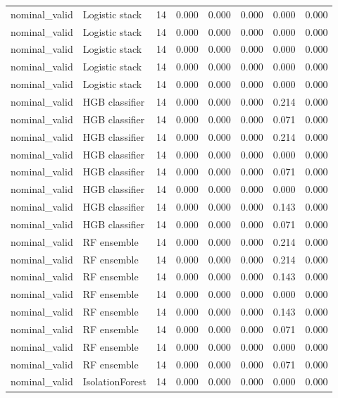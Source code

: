 {\begin{longtable}{llrrrrrr}
nominal\_valid & Logistic stack & 14 & 0.000 & 0.000 & 0.000 & 0.000 & 0.000 \\
nominal\_valid & Logistic stack & 14 & 0.000 & 0.000 & 0.000 & 0.000 & 0.000 \\
nominal\_valid & Logistic stack & 14 & 0.000 & 0.000 & 0.000 & 0.000 & 0.000 \\
nominal\_valid & Logistic stack & 14 & 0.000 & 0.000 & 0.000 & 0.000 & 0.000 \\
nominal\_valid & Logistic stack & 14 & 0.000 & 0.000 & 0.000 & 0.000 & 0.000 \\
nominal\_valid & HGB classifier & 14 & 0.000 & 0.000 & 0.000 & 0.214 & 0.000 \\
nominal\_valid & HGB classifier & 14 & 0.000 & 0.000 & 0.000 & 0.071 & 0.000 \\
nominal\_valid & HGB classifier & 14 & 0.000 & 0.000 & 0.000 & 0.214 & 0.000 \\
nominal\_valid & HGB classifier & 14 & 0.000 & 0.000 & 0.000 & 0.000 & 0.000 \\
nominal\_valid & HGB classifier & 14 & 0.000 & 0.000 & 0.000 & 0.071 & 0.000 \\
nominal\_valid & HGB classifier & 14 & 0.000 & 0.000 & 0.000 & 0.000 & 0.000 \\
nominal\_valid & HGB classifier & 14 & 0.000 & 0.000 & 0.000 & 0.143 & 0.000 \\
nominal\_valid & HGB classifier & 14 & 0.000 & 0.000 & 0.000 & 0.071 & 0.000 \\
nominal\_valid & RF ensemble & 14 & 0.000 & 0.000 & 0.000 & 0.214 & 0.000 \\
nominal\_valid & RF ensemble & 14 & 0.000 & 0.000 & 0.000 & 0.214 & 0.000 \\
nominal\_valid & RF ensemble & 14 & 0.000 & 0.000 & 0.000 & 0.143 & 0.000 \\
nominal\_valid & RF ensemble & 14 & 0.000 & 0.000 & 0.000 & 0.000 & 0.000 \\
nominal\_valid & RF ensemble & 14 & 0.000 & 0.000 & 0.000 & 0.143 & 0.000 \\
nominal\_valid & RF ensemble & 14 & 0.000 & 0.000 & 0.000 & 0.071 & 0.000 \\
nominal\_valid & RF ensemble & 14 & 0.000 & 0.000 & 0.000 & 0.000 & 0.000 \\
nominal\_valid & RF ensemble & 14 & 0.000 & 0.000 & 0.000 & 0.071 & 0.000 \\
nominal\_valid & IsolationForest & 14 & 0.000 & 0.000 & 0.000 & 0.000 & 0.000 \\

\end{longtable}}
